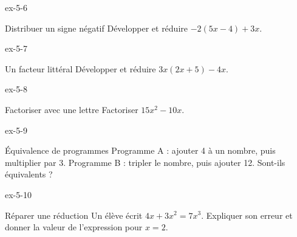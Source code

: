 \begin{blocLivre}{ex-5-6}\begin{exercice}[2]{Distribuer un signe négatif}
Développer et réduire $-2(5x-4)+3x$.
\end{exercice}\end{blocLivre}
\begin{blocLivre}{ex-5-7}\begin{exercice}[2]{Un facteur littéral}
Développer et réduire $3x(2x+5)-4x$.
\end{exercice}\end{blocLivre}
\begin{blocLivre}{ex-5-8}\begin{exercice}[2]{Factoriser avec une lettre}
Factoriser $15x^2-10x$.
\end{exercice}\end{blocLivre}
\begin{blocLivre}{ex-5-9}\begin{exercice}[2]{Équivalence de programmes}
Programme A : ajouter 4 à un nombre, puis multiplier par 3. Programme B : tripler le nombre, puis ajouter 12. Sont-ils équivalents ?
\end{exercice}\end{blocLivre}
\begin{blocLivre}{ex-5-10}\begin{exercice}[2]{Réparer une réduction}
Un élève écrit $4x+3x^2=7x^3$. Expliquer son erreur et donner la valeur de l’expression pour $x=2$.
\end{exercice}\end{blocLivre}

